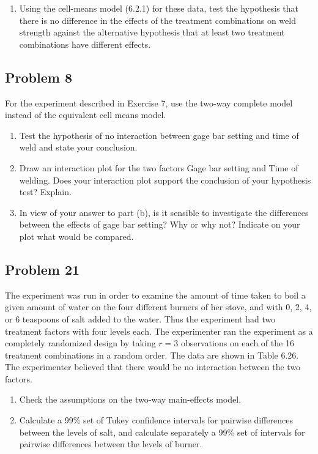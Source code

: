 \documentclass[12pt,]{article}
\providecommand{\tightlist}{%
  \setlength{\itemsep}{0pt}\setlength{\parskip}{0pt}}
\begin{document}
\begin{enumerate}
\def\labelenumi{(\alph{enumi})}
\tightlist
\item
  Using the cell-means model (6.2.1) for these data, test the hypothesis
  that there is no difference in the effects of the treatment
  combinations on weld strength against the alternative hypothesis that
  at least two treatment combinations have different effects.
\end{enumerate}

\subsection{Problem 8}\label{problem-8}

For the experiment described in Exercise 7, use the two-way complete
model instead of the equivalent cell means model.

\begin{enumerate}
\def\labelenumi{(\alph{enumi})}
\item
  Test the hypothesis of no interaction between gage bar setting and
  time of weld and state your conclusion.
\item
  Draw an interaction plot for the two factors Gage bar setting and Time
  of welding. Does your interaction plot support the conclusion of your
  hypothesis test? Explain.
\item
  In view of your answer to part (b), is it sensible to investigate the
  differences between the effects of gage bar setting? Why or why not?
  Indicate on your plot what would be compared.
\end{enumerate}

\subsection{Problem 21}\label{problem-21}

The experiment was run in order to examine the amount of time taken to
boil a given amount of water on the four different burners of her stove,
and with 0, 2, 4, or 6 teaspoons of salt added to the water. Thus the
experiment had two treatment factors with four levels each. The
experimenter ran the experiment as a completely randomized design by
taking \(r = 3\) observations on each of the 16 treatment combinations
in a random order. The data are shown in Table 6.26. The experimenter
believed that there would be no interaction between the two factors.

\begin{enumerate}
\def\labelenumi{(\alph{enumi})}
\item
  Check the assumptions on the two-way main-effects model.
\item
  Calculate a 99\% set of Tukey confidence intervals for pairwise
  differences between the levels of salt, and calculate separately a
  99\% set of intervals for pairwise differences between the levels of
  burner.
\end{enumerate}
\end{document}
